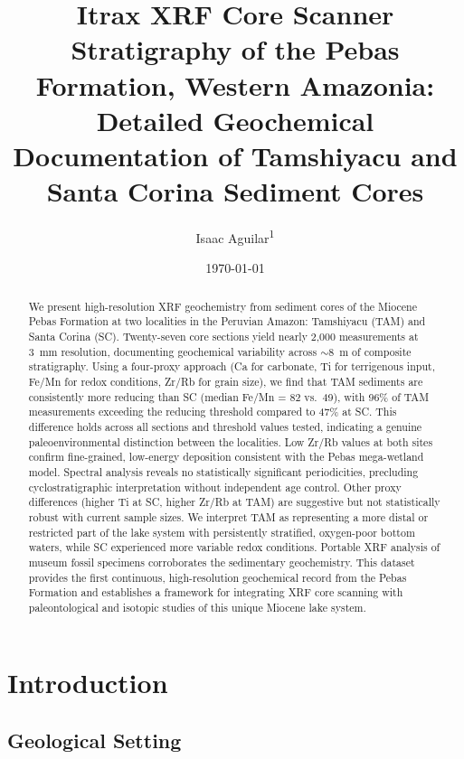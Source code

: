 \documentclass[11pt,a4paper]{article}
\title{Itrax XRF Core Scanner Stratigraphy of the Pebas Formation, Western Amazonia:\\
Detailed Geochemical Documentation of Tamshiyacu and Santa Corina Sediment Cores}
\author{Isaac Aguilar\textsuperscript{1}}
\date{\today}
\newcommand{\FeMn}{Fe/Mn}
\newcommand{\ZrRb}{Zr/Rb}
\begin{document}
\maketitle

\begin{abstract}
We present high-resolution XRF geochemistry from sediment cores of the Miocene Pebas Formation at two localities in the Peruvian Amazon: Tamshiyacu (TAM) and Santa Corina (SC). Twenty-seven core sections yield nearly 2,000 measurements at 3~mm resolution, documenting geochemical variability across $\sim$8~m of composite stratigraphy. Using a four-proxy approach (Ca for carbonate, Ti for terrigenous input, \FeMn{} for redox conditions, \ZrRb{} for grain size), we find that TAM sediments are consistently more reducing than SC (median \FeMn{} = 82 vs.\ 49), with 96\% of TAM measurements exceeding the reducing threshold compared to 47\% at SC. This difference holds across all sections and threshold values tested, indicating a genuine paleoenvironmental distinction between the localities. Low \ZrRb{} values at both sites confirm fine-grained, low-energy deposition consistent with the Pebas mega-wetland model. Spectral analysis reveals no statistically significant periodicities, precluding cyclostratigraphic interpretation without independent age control. Other proxy differences (higher Ti at SC, higher \ZrRb{} at TAM) are suggestive but not statistically robust with current sample sizes. We interpret TAM as representing a more distal or restricted part of the lake system with persistently stratified, oxygen-poor bottom waters, while SC experienced more variable redox conditions. Portable XRF analysis of museum fossil specimens corroborates the sedimentary geochemistry. This dataset provides the first continuous, high-resolution geochemical record from the Pebas Formation and establishes a framework for integrating XRF core scanning with paleontological and isotopic studies of this unique Miocene lake system.
\end{abstract}

\tableofcontents
\newpage

\section{Introduction}

\subsection{Geological Setting}
\end{document}
